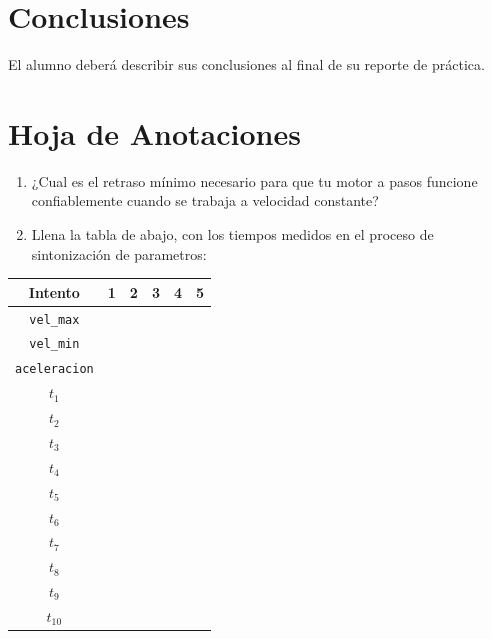 \section{Conclusiones}
	El alumno deberá describir sus conclusiones al final de su reporte de práctica.

\clearpage
\section{Hoja de Anotaciones}

	\begin{enumerate}
		\item ¿Cual es el retraso mínimo necesario para que tu motor a pasos funcione confiablemente cuando se trabaja a velocidad constante? \\ \vspace{1cm}
		\item Llena la tabla de abajo, con los tiempos medidos en el proceso de sintonización de parametros: \\
	\end{enumerate}

	\begin{tabular}{|c|c|c|c|c|c|}
		 \hline
		 Intento & 1 & 2 & 3 & 4 & 5 \\
		 \hline
		 \texttt{vel\_max} & \hspace{1.7cm} & \hspace{1.7cm} & \hspace{1.7cm} & \hspace{1.7cm} & \hspace{1.7cm} \\
		 \hline
		 \texttt{vel\_min} & & & & & \\
		 \hline
		 \texttt{aceleracion} & & & & & \\
		 \hline
		 $t_1$ & & & & & \\
		 \hline
		 $t_2$ & & & & & \\
		 \hline
		 $t_3$ & & & & & \\
		 \hline
		 $t_4$ & & & & & \\
		 \hline
		 $t_5$ & & & & & \\
		 \hline
		 $t_6$ & & & & & \\
		 \hline
		 $t_7$ & & & & & \\
		 \hline
		 $t_8$ & & & & & \\
		 \hline
		 $t_9$ & & & & & \\
		 \hline
		 $t_{10}$ & & & & & \\
		 \hline
	\end{tabular}

